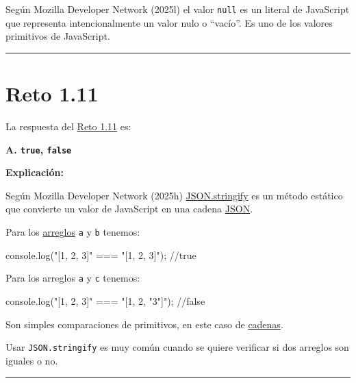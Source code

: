 \documentclass[
  letterpaper,
  DIV=11,
  numbers=noendperiod]{scrreprt}
\newenvironment{Shaded}{\begin{snugshade}}{\end{snugshade}}
\newcommand{\BuiltInTok}[1]{\textcolor[rgb]{0.00,0.23,0.31}{#1}}
\newcommand{\CommentTok}[1]{\textcolor[rgb]{0.37,0.37,0.37}{#1}}
\newcommand{\DecValTok}[1]{\textcolor[rgb]{0.68,0.00,0.00}{#1}}
\newcommand{\FunctionTok}[1]{\textcolor[rgb]{0.28,0.35,0.67}{#1}}
\newcommand{\NormalTok}[1]{\textcolor[rgb]{0.00,0.23,0.31}{#1}}
\newcommand{\OperatorTok}[1]{\textcolor[rgb]{0.37,0.37,0.37}{#1}}
\newcommand{\StringTok}[1]{\textcolor[rgb]{0.13,0.47,0.30}{#1}}
\begin{document}
Según Mozilla Developer Network (2025l) el valor \texttt{null} es un
literal de JavaScript que representa intencionalmente un valor nulo o
``vacío''. Es uno de los valores primitivos de JavaScript.

\begin{center}\rule{0.5\linewidth}{0.5pt}\end{center}

\section{Reto 1.11}\label{sec-sol-cap1-reto11}

La respuesta del \hyperref[sec-cap1-reto11]{Reto 1.11} es:

\textbf{A. \texttt{true}, \texttt{false}}

\textbf{Explicación:}

Según Mozilla Developer Network (2025h)
\hyperref[glos-json_stringify]{JSON.stringify} es un método estático que
convierte un valor de JavaScript en una cadena
\hyperref[glos-json]{JSON}.

Para los \hyperref[glos-arreglo]{arreglos} \texttt{a} y \texttt{b}
tenemos:

\begin{Shaded}
\begin{Highlighting}[]
\BuiltInTok{console}\OperatorTok{.}\FunctionTok{log}\NormalTok{(}\StringTok{"[1, 2, 3]"} \OperatorTok{===} \StringTok{"[1, 2, 3]"}\NormalTok{)}\OperatorTok{;} \CommentTok{//true}
\end{Highlighting}
\end{Shaded}

Para los arreglos \texttt{a} y \texttt{c} tenemos:

\begin{Shaded}
\begin{Highlighting}[]
\BuiltInTok{console}\OperatorTok{.}\FunctionTok{log}\NormalTok{(}\StringTok{"[1, 2, 3]"} \OperatorTok{===} \StringTok{"[1, 2, "}\DecValTok{3}\StringTok{"]"}\NormalTok{)}\OperatorTok{;} \CommentTok{//false}
\end{Highlighting}
\end{Shaded}

Son simples comparaciones de primitivos, en este caso de
\hyperref[glos-cadena]{cadenas}.

Usar \texttt{JSON.stringify} es muy común cuando se quiere verificar si
dos arreglos son iguales o no.

\begin{center}\rule{0.5\linewidth}{0.5pt}\end{center}
\end{document}

